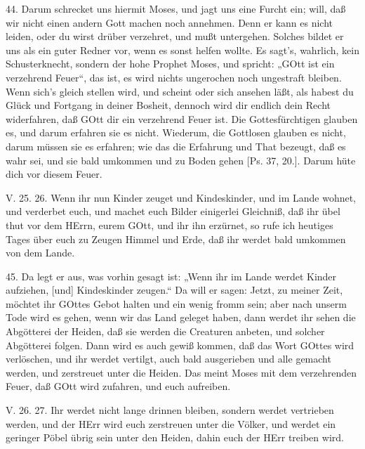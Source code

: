 44. Darum schrecket uns hiermit Moses, und jagt uns eine Furcht ein; will, daß wir nicht einen andern Gott machen noch annehmen. Denn er kann es nicht leiden, oder du wirst drüber verzehret, und mußt untergehen. Solches bildet er uns als ein guter Redner vor, wenn es sonst helfen wollte. Es sagt’s, wahrlich, kein Schusterknecht, sondern der hohe Prophet Moses, und spricht: „GOtt ist ein verzehrend Feuer“, das ist, es wird nichts ungerochen noch ungestraft bleiben. Wenn sich’s gleich stellen wird, und scheint oder sich ansehen läßt, als habest du Glück und Fortgang in deiner Bosheit, dennoch wird dir endlich dein Recht widerfahren, daß GOtt dir ein verzehrend Feuer ist. Die Gottesfürchtigen glauben es, und darum erfahren sie es nicht. Wiederum, die Gottlosen glauben es nicht, darum müssen sie es erfahren; wie das die Erfahrung und That bezeugt, daß es wahr sei, und sie bald umkommen und zu Boden gehen [Ps. 37, 20.]. Darum hüte dich vor diesem Feuer.

\begin{schriftzitat}
V. 25. 26. Wenn ihr nun Kinder zeuget und Kindeskinder, und im Lande wohnet, und verderbet euch, und machet euch Bilder einigerlei Gleichniß, daß ihr übel thut vor dem HErrn, eurem GOtt, und ihr ihn erzürnet, so rufe ich heutiges Tages über euch zu Zeugen Himmel und Erde, daß ihr werdet bald umkommen von dem Lande.
\end{schriftzitat}

45. Da legt er aus, was vorhin gesagt ist: „Wenn ihr im Lande werdet Kinder aufziehen, [und] Kindeskinder zeugen.“ Da will er sagen: Jetzt, zu meiner Zeit, möchtet ihr GOttes Gebot halten und ein wenig fromm sein; aber nach unserm Tode wird es gehen, wenn wir das Land geleget haben, dann werdet ihr sehen die Abgötterei der Heiden, daß sie werden die Creaturen anbeten, und solcher Abgötterei folgen. Dann wird es auch gewiß kommen, daß das Wort GOttes wird verlöschen, und ihr werdet vertilgt, auch bald ausgerieben und alle gemacht werden, und zerstreuet unter die Heiden. Das meint Moses mit dem verzehrenden Feuer, daß GOtt wird zufahren, und euch aufreiben.

\begin{schriftzitat}
V. 26. 27. Ihr werdet nicht lange drinnen bleiben, sondern werdet vertrieben werden, und der HErr wird euch zerstreuen unter die Völker, und werdet ein geringer Pöbel übrig sein unter den Heiden, dahin euch der HErr treiben wird.
\end{schriftzitat}

